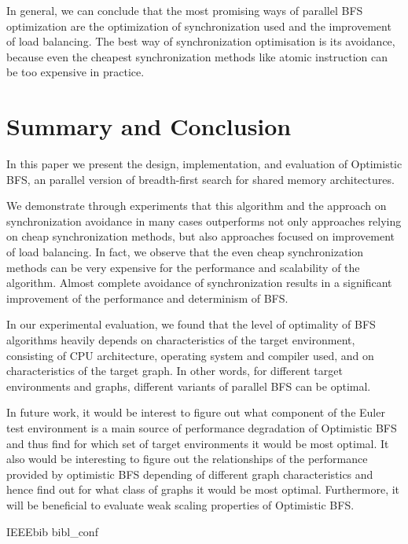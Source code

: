 \documentclass[letterpaper]{article}
\begin{document}
		In general, we can conclude that the most promising ways of parallel BFS optimization are the optimization of synchronization used and the improvement of load balancing. 
		The best way of synchronization optimisation is its avoidance, because even the cheapest synchronization methods like atomic instruction can be too expensive in practice.
		
	\section{Summary and Conclusion}\label{sec:suco} %
		In this paper we present the design, implementation, and evaluation of Optimistic BFS, an parallel version of breadth-first search for shared memory architectures.
		
		We demonstrate through experiments that this algorithm and the approach on synchronization avoidance in many cases outperforms not only approaches relying on cheap synchronization methods, but also approaches focused on improvement of load balancing. 		
		In fact, we observe that the even cheap synchronization methods can be very expensive for the performance and scalability of the algorithm.  
		Almost complete avoidance of synchronization results in a significant improvement of the performance and determinism of BFS. 
		
		In our experimental evaluation, we found that the level of optimality of BFS algorithms heavily depends on characteristics of the target environment, consisting of CPU architecture, operating system and compiler used, and on characteristics of the target graph. 
		In other words, for different target environments and graphs, different variants of parallel BFS can be optimal. 
		
		In future work, it would be interest to figure out what component of the Euler test environment is a main source of performance degradation of Optimistic BFS and thus find for which set of target environments it would be most optimal.  		
		It also would be interesting to figure out the relationships of the performance provided by optimistic BFS depending of different graph characteristics and hence find out for what class of graphs it would be most optimal.
		Furthermore, it will be beneficial to evaluate weak scaling properties of Optimistic BFS.
	
	 	{IEEEbib} %
	 		{bibl_conf}
\end{document}
